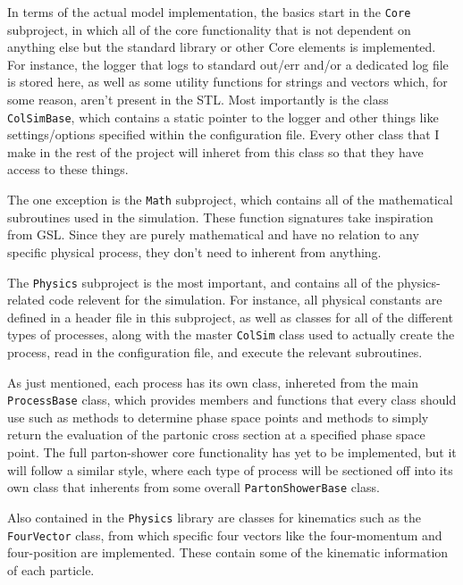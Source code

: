 In terms of the actual model implementation, the basics start in the \texttt{Core} subproject, in which all of the core functionality that is not dependent on anything else but the standard library or other Core elements is implemented. For instance, the logger that logs to standard out/err and/or a dedicated log file is stored here, as well as some utility functions for strings and vectors which, for some reason, aren't present in the STL. Most importantly is the class \texttt{ColSimBase}, which contains a static pointer to the logger and other things like settings/options specified within the configuration file. Every other class that I make in the rest of the project will inheret from this class so that they have access to these things.

The one exception is the \texttt{Math} subproject, which contains all of the mathematical subroutines used in the simulation. These function signatures take inspiration from GSL. Since they are purely mathematical and have no relation to any specific physical process, they don't need to inherent from anything.

The \texttt{Physics} subproject is the most important, and contains all of the physics-related code relevent for the simulation. For instance, all physical constants are defined in a header file in this subproject, as well as classes for all of the different types of processes, along with the master \texttt{ColSim} class used to actually create the process, read in the configuration file, and execute the relevant subroutines.

As just mentioned, each process has its own class, inhereted from the main \texttt{ProcessBase} class, which provides members and functions that every class should use such as methods to determine phase space points and methods to simply return the evaluation of the partonic cross section at a specified phase space point. The full parton-shower core functionality has yet to be implemented, but it will follow a similar style, where each type of process will be sectioned off into its own class that inherents from some overall \texttt{PartonShowerBase} class.

Also contained in the \texttt{Physics} library are classes for kinematics such as the \texttt{FourVector} class, from which specific four vectors like the four-momentum and four-position are implemented. These contain some of the kinematic information of each particle.

